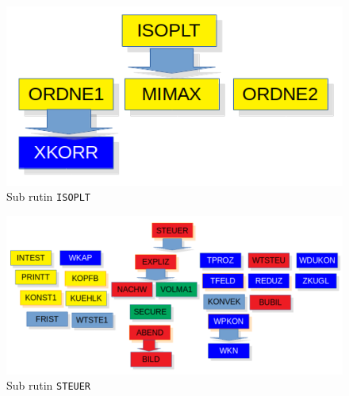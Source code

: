 \documentclass[a4paper,11pt]{report}
\begin{document}
\begin{figure}[h!]
  \begin{center}
    \includegraphics[scale=.5]{../isoplt.png}
    \caption{Sub rutin \texttt{ISOPLT}}
    \label{fig:isoplt}
  \end{center}
\end{figure}

\begin{figure}[h!]
  \begin{center}
    \includegraphics[scale=.5]{../steuer.png}
    \caption{Sub rutin \texttt{STEUER}}
    \label{fig:steuer}
  \end{center}
\end{figure}
\end{document}
